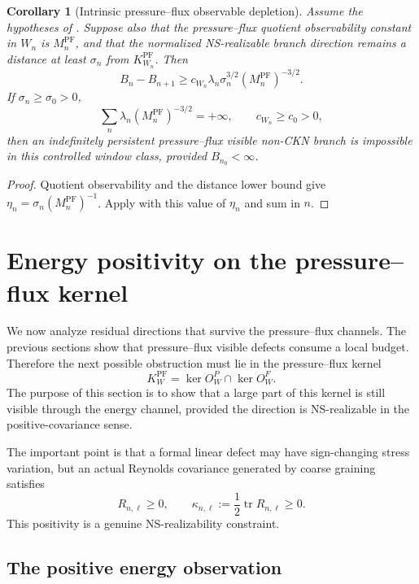 \documentclass[11pt]{article}
\numberwithin{equation}{section}
\theoremstyle{plain}
\newtheorem{corollary}[theorem]{Corollary}
\theoremstyle{definition}
\theoremstyle{remark}
\newcommand{\PF}{\mathrm{PF}}
\newcommand{\tr}{\operatorname{tr}}
\begin{document}
\begin{corollary}[Intrinsic pressure--flux observable depletion]
\label{cor:intrinsic-pf-observable-depletion}
Assume the hypotheses of .  Suppose also that the pressure--flux quotient observability constant in \(W_n\) is \(M_n^{\PF}\), and that the normalized NS-realizable branch direction remains a distance at least \(\sigma_n\) from \(K^{\PF}_{W_n}\).  Then
\[
        B_n-B_{n+1}
        \ge
        c_{W_n}\lambda_n\sigma_n^{3/2}(M^{\PF}_n)^{-3/2}.
\]
If \(\sigma_n\ge\sigma_0>0\),
\[
        \sum_n\lambda_n(M^{\PF}_n)^{-3/2}=+\infty,
        \qquad
        c_{W_n}\ge c_0>0,
\]
then an indefinitely persistent pressure--flux visible non-CKN branch is impossible in this controlled window class, provided \(B_{n_0}<\infty\).
\end{corollary}

\begin{proof}
Quotient observability and the distance lower bound give \(\eta_n=\sigma_n(M_n^{\PF})^{-1}\).  Apply  with this value of \(\eta_n\) and sum in \(n\).
\end{proof}

\section{Energy positivity on the pressure--flux kernel}
\label{sec:energy-positivity}

We now analyze residual directions that survive the pressure--flux channels.  The previous sections show that pressure--flux visible defects consume a local budget.  Therefore the next possible obstruction must lie in the pressure--flux kernel
\[
        K^{\PF}_W=
        \ker O^P_W\cap\ker O^F_W.
\]
The purpose of this section is to show that a large part of this kernel is still visible through the energy channel, provided the direction is NS-realizable in the positive-covariance sense.

The important point is that a formal linear defect may have sign-changing stress variation, but an actual Reynolds covariance generated by coarse graining satisfies
\[
        R_{n,\ell}\ge0,
        \qquad
        \kappa_{n,\ell}:=\frac12\tr R_{n,\ell}\ge0.
\]
This positivity is a genuine NS-realizability constraint.

\subsection{The positive energy observation}
\end{document}
